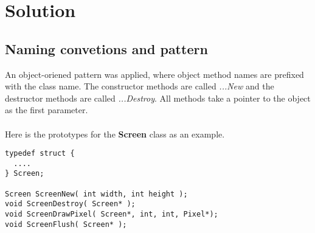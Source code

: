 \section{Solution}

\subsection{Naming convetions and pattern}

An object-oriened pattern was applied, where object method names are prefixed with the class name.
The constructor methods are called {\it ...New} and the destructor methods are called {\it ...Destroy}.
All methods take a pointer to the object as the first parameter.\\
\\
Here is the prototypes for the {\bf Screen} class as an example.

\begin{lstlisting}
typedef struct {
  ....
} Screen;

Screen ScreenNew( int width, int height );
void ScreenDestroy( Screen* );
void ScreenDrawPixel( Screen*, int, int, Pixel*);
void ScreenFlush( Screen* );
\end{lstlisting}
